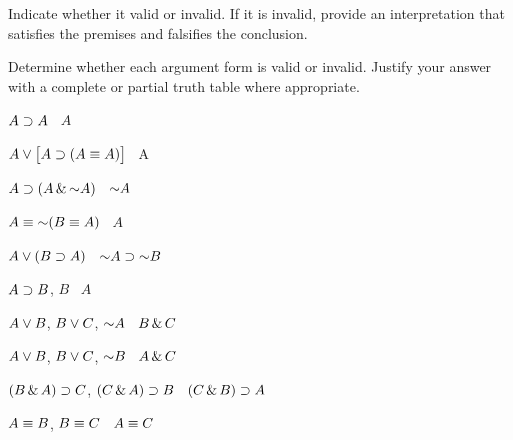 Indicate whether it valid or invalid. If it is invalid, provide an interpretation that satisfies the premises and falsifies the conclusion. 




\solutions
\problempart
\label{pr.TT.valid}
Determine whether each argument form is valid or invalid. Justify your answer with a complete or partial truth table where appropriate.
\begin{earg}
\item $A\supset A$ \therefore\ $A$ %
\item $A\vee\bigl[A\supset(A\equiv A)\bigr]$ \therefore\ A %
\item $A\eif(A\eand\enot A)$ \therefore\ $\enot A$ %
\item $A\eiff\enot(B\eiff A)$ \therefore\ $A$ %
\item $A\vee(B\supset A)$ \therefore\ $\enot A \eif \enot B$ %
\item $A\supset B$, $B$ \therefore\ $A$ %
\item $A\vee B$, $B\vee C$, $\enot A$ \therefore\ $B \,\&\, C$ %
\item $A\vee B$, $B\vee C$, $\enot B$ \therefore\ $A \,\&\, C$ %
\item $(B\,\&\, A)\supset C$, $(C\,\&\, A)\supset B$ \therefore\ $(C\,\&\, B)\supset A$ %
\item $A\equiv B$, $B\equiv C$ \therefore\ $A\equiv C$ %
\end{earg}

